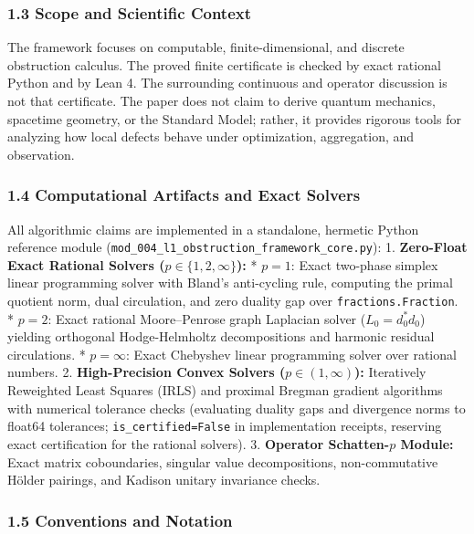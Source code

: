\documentclass[
]{article}
\begin{document}
\subsubsection{1.3 Scope and Scientific Context}\label{scope-and-scientific-context}

The framework focuses on computable, finite-dimensional, and discrete obstruction calculus. The proved finite certificate is checked by exact rational Python and by Lean 4. The surrounding continuous and operator discussion is not that certificate. The paper does not claim to derive quantum mechanics, spacetime geometry, or the Standard Model; rather, it provides rigorous tools for analyzing how local defects behave under optimization, aggregation, and observation.

\subsubsection{1.4 Computational Artifacts and Exact Solvers}\label{computational-artifacts-and-exact-solvers}

All algorithmic claims are implemented in a standalone, hermetic Python reference module (\texttt{mod\_004\_l1\_obstruction\_framework\_core.py}):
1. \textbf{Zero-Float Exact Rational Solvers (\(p \in \{1, 2, \infty\}\)):}
* \(p=1\): Exact two-phase simplex linear programming solver with Bland's anti-cycling rule, computing the primal quotient norm, dual circulation, and zero duality gap over \texttt{fractions.Fraction}.
* \(p=2\): Exact rational Moore--Penrose graph Laplacian solver (\(L_0 = d_0^* d_0\)) yielding orthogonal Hodge-Helmholtz decompositions and harmonic residual circulations.
* \(p=\infty\): Exact Chebyshev linear programming solver over rational numbers.
2. \textbf{High-Precision Convex Solvers (\(p \in (1, \infty)\)):} Iteratively Reweighted Least Squares (IRLS) and proximal Bregman gradient algorithms with numerical tolerance checks (evaluating duality gaps and divergence norms to float64 tolerances; \texttt{is\_certified=False} in implementation receipts, reserving exact certification for the rational solvers).
3. \textbf{Operator Schatten-\(p\) Module:} Exact matrix coboundaries, singular value decompositions, non-commutative Hölder pairings, and Kadison unitary invariance checks.

\subsubsection{1.5 Conventions and Notation}\label{conventions-and-notation}
\end{document}
